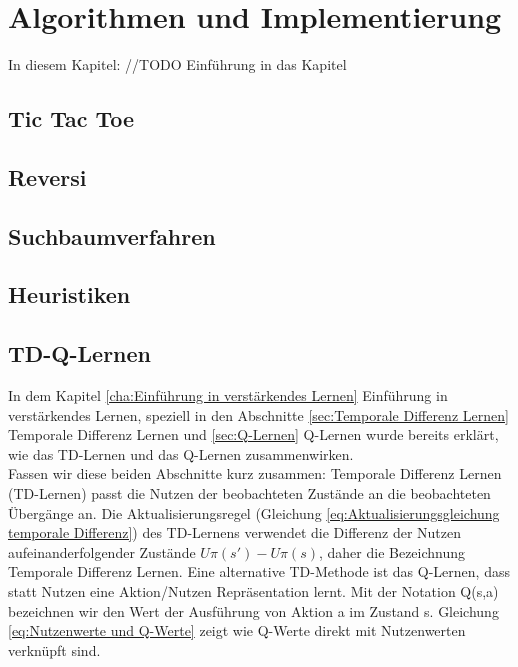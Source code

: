 \chapter{Algorithmen und Implementierung}
\label{cha:Algorithmen und Implementierung}

In diesem Kapitel: //TODO Einführung in das Kapitel

\section{Tic Tac Toe}

\section{Reversi}

\section{Suchbaumverfahren}

\section{Heuristiken}

\section{TD-Q-Lernen}
In dem Kapitel \ref{cha:Einführung in verstärkendes Lernen} Einführung in verstärkendes Lernen, speziell in den Abschnitte \ref{sec:Temporale Differenz Lernen} Temporale Differenz Lernen und \ref{sec:Q-Lernen} Q-Lernen wurde bereits erklärt, wie das TD-Lernen und das Q-Lernen zusammenwirken. \\

Fassen wir diese beiden Abschnitte kurz zusammen: Temporale Differenz Lernen (TD-Lernen) passt die Nutzen der beobachteten Zustände an die beobachteten Übergänge an. Die Aktualisierungsregel (Gleichung \ref{eq:Aktualisierungsgleichung temporale Differenz}) des TD-Lernens verwendet die Differenz der Nutzen aufeinanderfolgender Zustände $U\pi(s') - U\pi(s)$, daher die Bezeichnung Temporale Differenz Lernen. Eine alternative TD-Methode ist das Q-Lernen, dass statt Nutzen eine Aktion/Nutzen Repräsentation lernt. Mit der Notation Q(s,a) bezeichnen wir den Wert der Ausführung von Aktion a im Zustand s. Gleichung \ref{eq:Nutzenwerte und Q-Werte} zeigt wie Q-Werte direkt mit Nutzenwerten verknüpft sind. \\

